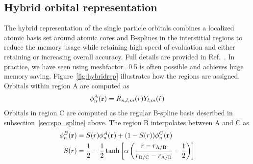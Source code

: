 \subsection{Hybrid orbital representation}
\label{sec:spo_hybrid}
The hybrid representation of the single particle orbitals combines a localized atomic basis set around atomic cores and B-splines in the interstitial regions to reduce the memory usage while retaining high speed of evaluation and either retaining or increasing overall accuracy. Full details are provided in Ref.~\cite{Luo2018hyb}.
In practice, we have seen using meshfactor=0.5 is often possible and achieves huge memory saving.
Figure~\ref{fig:hybridrep} illustrates how the regions are assigned. Orbitals within region A are computed as
\[
  \phi^A_n({\bf r})=R_{n,l,m}(r)Y_{l,m}(\hat{r})
\]
Orbitals in region C are computed as the regular B-spline basis described in subsection~\ref{sec:spo_spline} above. The region B interpolates between A and C as
\begin{align}
  \phi^B_n({\bf r}) &= S(r) \phi^A_n({\bf r}) + (1-S(r))\phi^C_n({\bf r}) \\
                S(r) &= \frac{1}{2}-\frac{1}{2}\tanh\left[\alpha\left(\frac{r-r_{\rm A/B}}{r_{\rm B/C}-r_{\rm A/B}}-\frac{1}{2}\right)\right]
\end{align}

